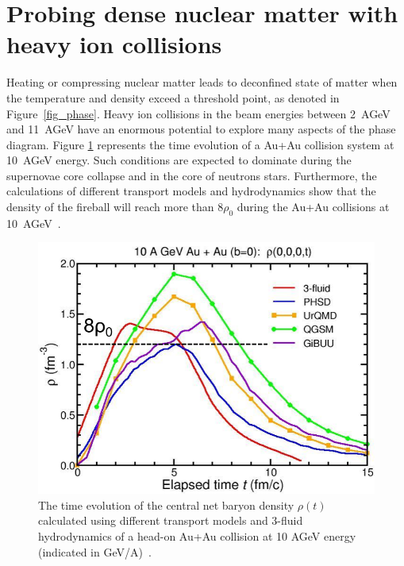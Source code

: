 \section{Probing dense nuclear matter with heavy ion collisions}

Heating or compressing nuclear matter leads to deconfined state of matter when the temperature and density exceed a threshold point, as denoted in Figure~\ref{fig_phase}. Heavy ion collisions in the beam energies between 2~AGeV and 11~AGeV have an enormous potential to explore many aspects of the phase diagram. Figure \ref{fig:cbm_density} represents the time evolution of a Au+Au collision system at 10~AGeV energy. Such conditions are expected to dominate during the supernovae core collapse and in the core of neutrons stars. Furthermore, the calculations of different transport models and hydrodynamics show that the density of the fireball will reach more than $8\rho_{0}$ during the Au+Au collisions at 10~AGeV~\cite{CBM_physics}.
\newpage
\begin{figure}[!h]
    \centering
    \includegraphics[width=0.65\columnwidth]{Chapter1/images/CBM_density.png}
    \caption{The time evolution of the central net baryon density $\rho(t)$ calculated using different transport models and 3-fluid hydrodynamics of a head-on Au+Au collision at 10 AGeV energy (indicated in GeV/A)~\cite{CBM_physics}.}
    \label{fig:cbm_density}
\end{figure}

